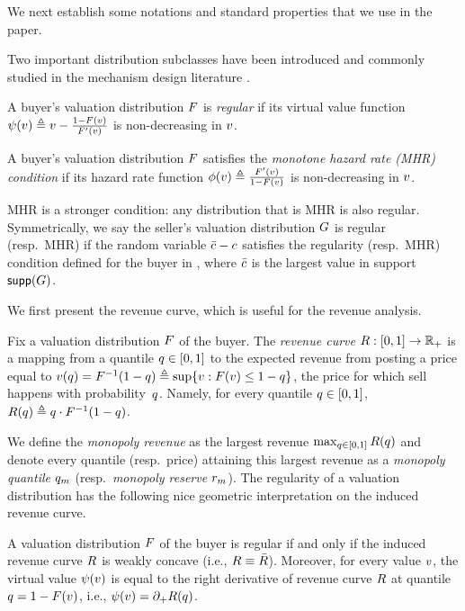 We next establish some notations and standard properties that we use in the paper. 

Two important distribution subclasses have been introduced and commonly studied in the mechanism design literature \citep{mye-81,MS-83}.
\begin{definition}
\label{def:regularity buyer}
    A buyer's valuation distribution $F$ is \emph{regular} if its virtual value function 
    $
        \psi(v) \triangleq v -
        \frac{1 - F(v)}{F'(v)}
    $
    is non-decreasing in $v$. 
    
    A buyer's valuation distribution $F$ satisfies the \emph{monotone hazard rate (MHR) condition} if its hazard rate function 
    $
        \phi(v) \triangleq
        \frac{F'(v)}{1 - F(v)}
        $
    is non-decreasing in $v$.
\end{definition}
MHR is a stronger condition: any distribution that is MHR is also regular. Symmetrically, we say the seller's valuation distribution $G$ is regular (resp.\ MHR) if the random variable $\bar{c} - c$ satisfies the regularity (resp.\ MHR) condition defined for the buyer in , where $\bar{c}$ is the largest value in support ${\sf supp}(G)$. 

We first present the revenue curve, which is useful for the revenue analysis.

\begin{definition}
    Fix a valuation distribution $F$ of the buyer. The \emph{revenue curve} $R:[0, 1]\rightarrow\mathbb{R}_+$ is a mapping from a quantile $q\in[0, 1]$ to the expected revenue from posting a price equal to $v(q)= F^{-1}(1 - q)  \triangleq \sup\{v:F(v) \leq 1 - q\}$, the price for which sell happens with probability~$q$. Namely, for every quantile $q\in[0, 1]$, $R(q) \triangleq q\cdot F^{-1}(1 - q)$.
\end{definition}
We define the \emph{monopoly revenue} as the largest revenue $\max_{q\in[0, 1]}R(q)$ and denote every quantile (resp.\ price) attaining this largest revenue as a \emph{monopoly quantile} $q_m$ (resp.\ \emph{monopoly reserve $r_m$}).
The regularity of a valuation distribution has the following nice geometric interpretation on the induced revenue curve. 
\begin{lemma}[\citealp{BR-89}]
\label{lem:concave revenue curve}
    A valuation distribution $F$ of the buyer is regular if and only if the induced revenue curve $R$ is weakly concave (i.e., $R \equiv \bar{R}$). Moreover, for every value $v$, the virtual value $\psi(v)$ is equal to the right derivative of revenue curve $R$ at quantile $q = 1  - F(v)$, i.e., $\psi(v) = \partial_+R(q)$. 
\end{lemma} 

